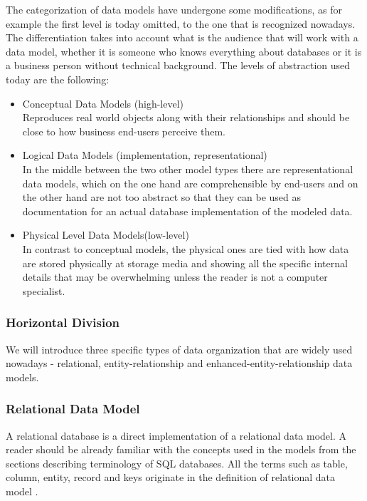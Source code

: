 The categorization of data models have undergone some modifications, as for example the first level is today omitted, to the one that is recognized nowadays. The differentiation takes into account what is the audience that will work with a data model, whether it is someone who knows everything about databases or it is a business person without technical background. The levels of abstraction used today\cite{SilberschatzKorthSudarshan10} are the following: 
\begin{itemize}
	\item Conceptual Data Models (high-level) \\
	Reproduces real world objects along with their relationships and should be close to how business end-users perceive them.
	
	\item Logical Data Models (implementation, representational) \\
	In the middle between the two other model types there are representational data models, which on the one hand are comprehensible by end-users and on the other hand are not too abstract so that they can be used as documentation for an actual database implementation of the modeled data.
	
	\item Physical Level Data Models(low-level) \\
	In contrast to conceptual models, the physical ones are tied with how data are stored physically at storage media and showing all the specific internal details that may be overwhelming unless the reader is not a computer specialist.
\end{itemize}

\subsubsection{Horizontal Division}

We will introduce three specific types of data organization that are widely used nowadays - relational, entity-relationship and enhanced-entity-relationship data models.

\subsubsection{Relational Data Model}

A relational database is a direct implementation of a relational data model. A reader should be already familiar with the concepts used in the models from the sections describing terminology of SQL databases. All the terms such as table, column, entity, record and keys originate in the definition of relational data model \cite{Codd69}.

